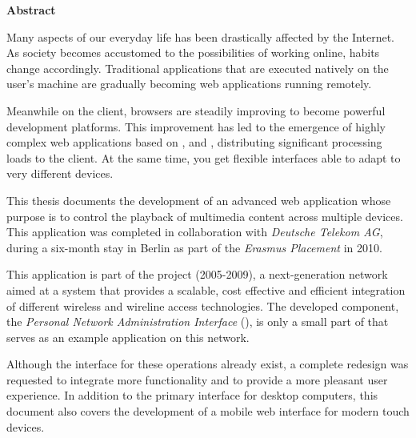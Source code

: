 \begin{center}
  \Large{\textbf{Abstract}}
\end{center}

Many aspects of our everyday life has been drastically affected by the Internet.
As society becomes accustomed to the possibilities of working online, habits change accordingly.
Traditional applications that are executed natively on the user's machine are gradually becoming web applications running remotely.

Meanwhile on the client, browsers are steadily improving to become powerful development platforms.
This improvement has led to the emergence of highly complex web applications based on ,  and , distributing significant processing loads to the client.
At the same time, you get flexible interfaces able to adapt to very different devices.

This thesis documents the development of an advanced web application whose purpose is to control the playback of multimedia content across multiple devices.
This application was completed in collaboration with \emph{Deutsche Telekom AG}, during a six-month stay in Berlin as part of the \emph{Erasmus Placement} in 2010.

This application is part of the  project (2005-2009), a next-generation network aimed at a system that provides a scalable, cost effective and efficient integration of different wireless and wireline access technologies.
The developed component, the \emph{Personal Network Administration Interface} (), is only a small part of  that serves as an example application on this network.

Although the interface for these operations already exist, a complete redesign was requested to integrate more functionality and to provide a more pleasant user experience. In addition to the primary interface for desktop computers, this document also covers the development of a mobile web interface for modern touch devices.
